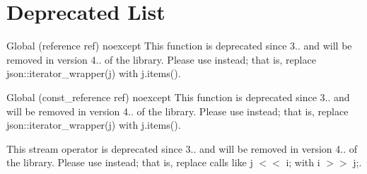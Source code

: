 \chapter{Deprecated List}
\hypertarget{a00650}{}\label{a00650}

\begin{DoxyRefList}
\item[Global \doxylink{a01541_a7cd832311e7c2f2cf5ca07c4bc4011cd}{nlohmann\+::basic\+\_\+json\texorpdfstring{$<$}{<} Object\+Type, Array\+Type, String\+Type, Boolean\+Type, Number\+Integer\+Type, Number\+Unsigned\+Type, Number\+Float\+Type, Allocator\+Type, JSONSerializer, Binary\+Type \texorpdfstring{$>$}{>}\+::iterator\+\_\+wrapper} (reference ref) noexcept]\label{a00650__deprecated000001}%
%
This function is deprecated since 3.. and will be removed in version 4.. of the library. Please use  instead; that is, replace {\ttfamily json\+::iterator\+\_\+wrapper(j)} with {\ttfamily j.\+items()}.  
\item[Global \doxylink{a01541_a289c7ce4ae9eea044b8cb0e0f74fa082}{nlohmann\+::basic\+\_\+json\texorpdfstring{$<$}{<} Object\+Type, Array\+Type, String\+Type, Boolean\+Type, Number\+Integer\+Type, Number\+Unsigned\+Type, Number\+Float\+Type, Allocator\+Type, JSONSerializer, Binary\+Type \texorpdfstring{$>$}{>}\+::iterator\+\_\+wrapper} (const\+\_\+reference ref) noexcept]\label{a00650__deprecated000002}%
%
This function is deprecated since 3.. and will be removed in version 4.. of the library. Please use  instead; that is, replace {\ttfamily json\+::iterator\+\_\+wrapper(j)} with {\ttfamily j.\+items()}.  
\item[Global \doxylink{a01541_af9907af448f7ff794120033e132025f6}{nlohmann\+::basic\+\_\+json\texorpdfstring{$<$}{<} Object\+Type, Array\+Type, String\+Type, Boolean\+Type, Number\+Integer\+Type, Number\+Unsigned\+Type, Number\+Float\+Type, Allocator\+Type, JSONSerializer, Binary\+Type \texorpdfstring{$>$}{>}\+::operator\texorpdfstring{$<$}{<}\texorpdfstring{$<$}{<}} (\doxylink{a01541}{basic\+\_\+json} \&j, std\+::istream \&i)]\label{a00650__deprecated000005}%
%
This stream operator is deprecated since 3.. and will be removed in version 4.. of the library. Please use  instead; that is, replace calls like {\ttfamily j \texorpdfstring{$<$}{<}\texorpdfstring{$<$}{<} i;} with {\ttfamily i \texorpdfstring{$>$}{>}\texorpdfstring{$>$}{>} j;}.  

\end{DoxyRefList}
